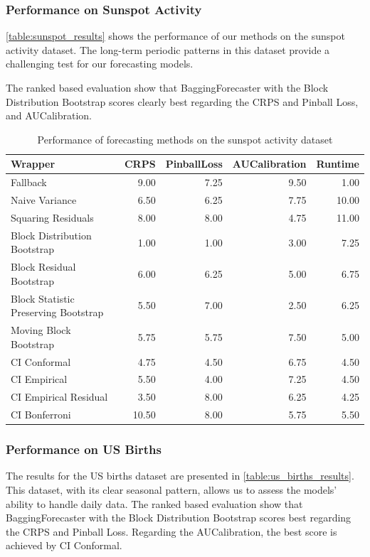 \subsubsection{Performance on Sunspot Activity}
\autoref{table:sunspot_results} shows the performance of our methods on the sunspot activity dataset. The long-term periodic patterns in this dataset provide a challenging test for our forecasting models.

The ranked based evaluation show that BaggingForecaster with the Block Distribution Bootstrap scores clearly best regarding the CRPS and Pinball Loss, and AUCalibration.
\begin{table}[h]
    \centering
    \caption{Performance of forecasting methods on the sunspot activity dataset}
    \label{table:sunspot_results}
\begin{tabular}{lrrrr}
\toprule
Wrapper & CRPS & PinballLoss & AUCalibration & Runtime \\
\midrule
Fallback & 9.00 & 7.25 & 9.50 & 1.00 \\
Naive Variance & 6.50 & 6.25 & 7.75 & 10.00 \\
Squaring Residuals & 8.00 & 8.00 & 4.75 & 11.00 \\
Block Distribution Bootstrap & 1.00 & 1.00 & 3.00 & 7.25 \\
Block Residual Bootstrap & 6.00 & 6.25 & 5.00 & 6.75 \\
Block Statistic Preserving Bootstrap & 5.50 & 7.00 & 2.50 & 6.25 \\
Moving Block Bootstrap & 5.75 & 5.75 & 7.50 & 5.00 \\
CI Conformal & 4.75 & 4.50 & 6.75 & 4.50 \\
CI Empirical & 5.50 & 4.00 & 7.25 & 4.50 \\
CI Empirical Residual & 3.50 & 8.00 & 6.25 & 4.25 \\
CI Bonferroni  & 10.50 & 8.00 & 5.75 & 5.50 \\
\bottomrule
\end{tabular}


\end{table}

\subsubsection{Performance on US Births}
The results for the US births dataset are presented in \autoref{table:us_births_results}. This dataset, with its clear seasonal pattern, allows us to assess the models' ability to handle daily data.
The ranked based evaluation show that BaggingForecaster with the Block Distribution Bootstrap scores best regarding the CRPS and Pinball Loss.
Regarding the AUCalibration, the best score is achieved by CI Conformal.

